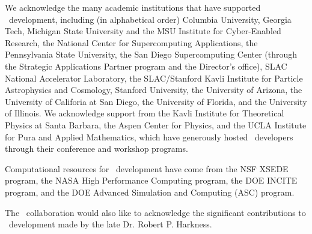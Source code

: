 We acknowledge the  many academic institutions that have supported \enzo\
development, including (in alphabetical order)
Columbia University,
Georgia Tech,
Michigan State University and the MSU Institute for Cyber-Enabled
Research, 
the National Center for Supercomputing Applications, 
the Pennsylvania State University,
 the San Diego Supercomputing Center (through the Strategic Applications
Partner program and the Director’s office),
SLAC National Accelerator Laboratory,
the SLAC/Stanford Kavli Institute for Particle
Astrophysics and Cosmology,  
Stanford University,
the University of Arizona,
the University of Califoria at San Diego, 
the University of Florida,
and the University of Illinois.
We acknowledge support from the Kavli Institute for Theoretical
Physics at Santa Barbara, the Aspen Center for Physics, and the UCLA
Institute for Pura and Applied Mathematics, which have
generously hosted \enzo\ developers through their conference and
workshop programs.

Computational resources for \enzo\ development have come from the NSF
XSEDE program, the NASA High Performance Computing program, the DOE INCITE
program, and the DOE Advanced Simulation and Computing (ASC) program.

The \enzo\ collaboration would also like to acknowledge the significant contributions to
\enzo\ development made by the late Dr. Robert P. Harkness. 

